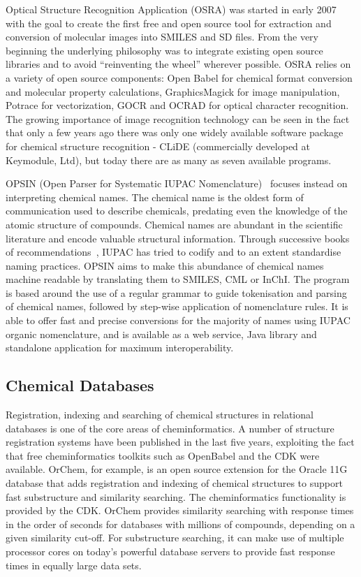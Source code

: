 \documentclass[10pt]{bmc_article}
\newenvironment{bmcformat}{\fussy\setboolean{publ}{true}}{\fussy}
\begin{document}
\begin{bmcformat}
Optical Structure Recognition Application (OSRA) \cite{WebOSRA} was started
in early 2007 with the goal to create the first free and open source
tool for extraction and conversion of molecular images into SMILES and
SD files. From the very beginning the underlying philosophy was to integrate
existing open source libraries and to avoid ``reinventing the wheel''
wherever possible. OSRA relies on a variety of open source components:
Open Babel for chemical format
conversion and molecular property calculations, GraphicsMagick for image
manipulation, Potrace for vectorization, GOCR and OCRAD for optical
character recognition. The growing importance of image
recognition technology can be seen in the fact that
only a few years ago there was only one widely available software
package for chemical structure recognition -  CLiDE (commercially
developed at Keymodule, Ltd), but today there are as many as seven
available programs.

OPSIN (Open Parser for Systematic IUPAC
Nomenclature)~\cite{lowe_chemical_2011} focuses instead on interpreting chemical names.
The chemical name is the oldest form of communication used to
describe chemicals, predating
even the knowledge of the atomic structure of compounds.
Chemical names are abundant in the scientific
literature and encode valuable structural information.
Through successive books of
recommendations~\cite{iupac_nomenclature_1979, iupac_guide_1993},
IUPAC has tried to codify and to an extent standardise naming practices.
OPSIN aims to make this abundance of
chemical names machine readable by translating them to SMILES, CML or
InChI. The program is based around the use of a regular grammar to
guide tokenisation and parsing of chemical names, followed by
step-wise application of nomenclature rules. It is able to offer
fast and precise conversions for the majority of names using IUPAC
organic nomenclature, and is available as a web service, Java
library and standalone application for maximum interoperability.

\subsection*{Chemical Databases}

Registration, indexing and searching of chemical structures in
relational databases is one of the core areas of cheminformatics.
A number of structure registration systems have been published in the last five years, exploiting the fact that
free cheminformatics toolkits such as OpenBabel and the CDK were available.
OrChem,\cite{WebOrChem} for example, is an open source extension for the Oracle 11G database that
adds registration and indexing of chemical structures to support fast
substructure and similarity searching. The cheminformatics
functionality is provided by the CDK. OrChem
provides similarity searching with response times in the order of
seconds for databases with millions of compounds, depending on a given
similarity cut-off. For substructure searching, it can make use of
multiple processor cores on today's powerful database servers to
provide fast response times in equally large data sets.


\end{bmcformat}
\end{document}
